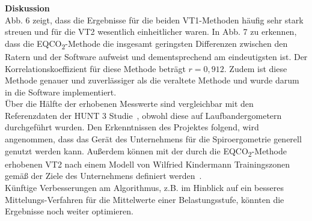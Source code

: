 \textbf{\Large Diskussion}\\

Abb. 6 zeigt, dass die Ergebnisse für die beiden VT1-Methoden häufig sehr stark streuen und für die VT2 wesentlich einheitlicher waren. In Abb. 7 zu erkennen, dass die EQCO\textsubscript{2}-Methode die insgesamt geringsten Differenzen zwischen den Ratern und der Software aufweist und dementsprechend am eindeutigsten ist. Der Korrelationskoeffizient für diese Methode beträgt $r = 0,912$. Zudem ist diese Methode genauer und zuverlässiger als die veraltete Methode und wurde darum in die Software implementiert.\\
Über die Hälfte der erhobenen Messwerte sind vergleichbar mit den Referenzdaten der HUNT 3 Studie~\cite{Loe.2014}, obwohl diese auf Laufbandergometern durchgeführt wurden. Den Erkenntnissen des Projektes folgend, wird angenommen, dass das Gerät des Unternehmens für die Spiroergometrie generell genutzt werden kann. Außerdem können mit der durch die EQCO\textsubscript{2}-Methode erhobenen VT2 nach einem Modell von Wilfried Kindermann Trainingszonen gemäß der Ziele des Unternehmens definiert werden~\cite{Kindermann.2004}.\\
Künftige Verbesserungen am Algorithmus, z.B. im Hinblick auf ein besseres Mittelungs-Verfahren für die Mittelwerte einer Belastungsstufe, könnten die Ergebnisse noch weiter optimieren.